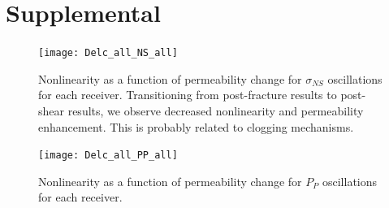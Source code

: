 \documentclass[letterpaper,10pt]{article}
\begin{document}
\newpage

%

\section{Supplemental}
\begin{figure}[ht]
	\centering
	\texttt{[image: Delc\_all\_NS\_all]}
	\caption{Nonlinearity as a function of permeability change for $ \sigma_{NS} $ oscillations for each receiver. Transitioning from post-fracture results to post-shear results, we observe decreased nonlinearity and permeability enhancement. This is probably related to clogging mechanisms.}%
	\label{fig:delc_plots_ns}
\end{figure}

\newpage

\begin{figure}[ht]
	\centering
	\texttt{[image: Delc\_all\_PP\_all]}
	\caption{Nonlinearity as a function of permeability change for $ P_P $ oscillations for each receiver.}
	\label{fig:delc_plots_pp}
\end{figure}
\end{document}
